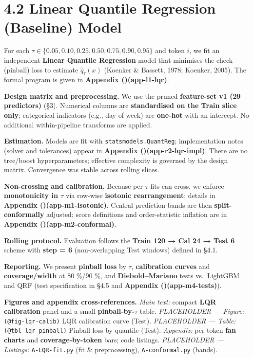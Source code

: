 \documentclass[
  a4paper,
  DIV=11,
  numbers=noendperiod]{scrreprt}
\begin{document}
\section{4.2 Linear Quantile Regression (Baseline)
Model}\label{linear-quantile-regression-baseline-model}

For each \(\tau\in\{0.05,0.10,0.25,0.50,0.75,0.90,0.95\}\) and token
\(i\), we fit an independent \textbf{Linear Quantile Regression} model
that minimises the check (pinball) loss to estimate
\(\widehat q_\tau(x)\) (Koenker \& Bassett, 1978; Koenker, 2005). The
formal program is given in \textbf{Appendix
()(app-l1-lqr)}.

\textbf{Design matrix and preprocessing.} We use the pruned
\textbf{feature-set v1 (29 predictors)} (§3). Numerical columns are
\textbf{standardised on the Train slice only}; categorical indicators
(e.g., day-of-week) are \textbf{one-hot} with an intercept. No
additional within-pipeline transforms are applied.

\textbf{Estimation.} Models are fit with \texttt{statsmodels.QuantReg};
implementation notes (solver and tolerances) appear in \textbf{Appendix
()(app-r2-lqr-impl)}. There are no
tree/boost hyperparameters; effective complexity is governed by the
design matrix. Convergence was stable across rolling slices.

\textbf{Non-crossing and calibration.} Because per-\(\tau\) fits can
cross, we enforce \textbf{monotonicity in \(\tau\)} via row-wise
\textbf{isotonic rearrangement}; details in \textbf{Appendix
()(app-m1-isotonic)}. Central
prediction bands are then \textbf{split-conformally} adjusted; score
definitions and order-statistic inflation are in \textbf{Appendix
()(app-m2-conformal)}.

\textbf{Rolling protocol.} Evaluation follows the \textbf{Train 120 →
Cal 24 → Test 6} scheme with \textbf{step = 6} (non-overlapping Test
windows) defined in §4.1.

\textbf{Reporting.} We present \textbf{pinball loss} by \(\tau\),
\textbf{calibration curves} and \textbf{coverage/width} at 80 \%/90 \%,
and \textbf{Diebold--Mariano} tests vs.~LightGBM and QRF (test
specification in §4.5 and \textbf{Appendix
()(app-m4-tests)}).

\textbf{Figures and appendix cross-references.} \emph{Main text:}
compact \textbf{LQR calibration} panel and a small
\textbf{pinball-by-\(\tau\)} table. \emph{PLACEHOLDER --- Figure:}
\texttt{(@fig-lqr-calib)} LQR calibration curve (Test).
\emph{PLACEHOLDER --- Table:} \texttt{(@tbl-lqr-pinball)} Pinball loss
by quantile (Test). \emph{Appendix:} per-token \textbf{fan charts} and
\textbf{coverage-by-token} bars; code listings. \emph{PLACEHOLDER ---
Listings:} \texttt{A-LQR-fit.py} (fit \& preprocessing),
\texttt{A-conformal.py} (bands).
\end{document}
